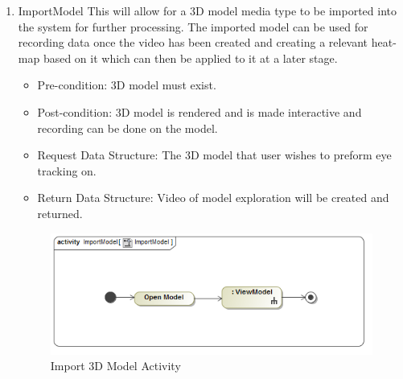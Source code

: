 	\begin{enumerate}
		\item{ImportModel}
		\newline
		This will allow for a 3D model media type to be imported into the system for further processing. The imported model can be used for recording data once the video has been created and creating a relevant heat-map based on it which can then be applied to it at a later stage.
		\begin{itemize}
			\item Pre-condition: 3D model must exist.
			\item Post-condition: 3D model is rendered and is made interactive and recording can be done on the model.
			\item Request Data Structure: The 3D model that user wishes to preform eye tracking on.
			\item Return Data Structure: Video of model exploration will be created and returned.
		\end{itemize}
		
		\begin{figure}[!ht]
			\centering
			\includegraphics[scale=0.5,width=15cm,keepaspectratio]{Diagrams/Activity_Diagram__ImportModel__ImportModel.png}
			\caption{Import 3D Model Activity}
		\end{figure}
	

\end{enumerate}
